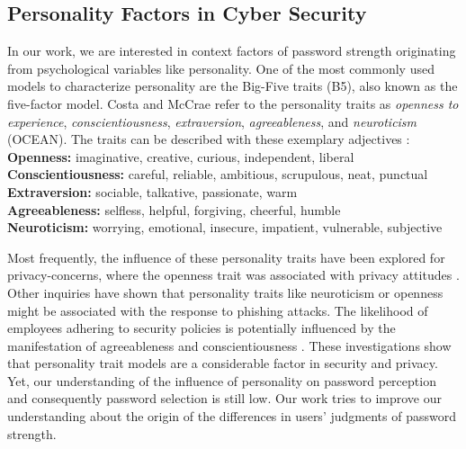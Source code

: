 \subsection{Personality Factors in Cyber Security}
In our work, we are interested in context factors of password strength originating from psychological variables like personality. One of the most commonly used models to characterize personality are the Big-Five traits (B5), also known as the five-factor model. Costa and McCrae \cite{Costa1992NEO} refer to the personality traits as \textit{openness to experience}, \textit{conscientiousness}, \textit{extraversion}, \textit{agreeableness}, and \textit{neuroticism} (OCEAN). The traits can be described with these exemplary adjectives \cite{McCrae1987ValidationFFM}:\\
\textbf{Openness:} imaginative, creative, curious, independent, liberal\\
\textbf{Conscientiousness:} careful, reliable, ambitious, scrupulous, neat, punctual\\
\textbf{Extraversion:} sociable, talkative, passionate, warm\\
\textbf{Agreeableness:} selfless, helpful, forgiving, cheerful, humble\\
\textbf{Neuroticism:} worrying, emotional, insecure, impatient, vulnerable, subjective

Most frequently, the influence of these personality traits have been explored for privacy-concerns, where the openness trait was associated with privacy attitudes \cite{Egelman2015PredictingAttitudes,Minkus2014PersonalizationPrivacy}. Other inquiries have shown that personality traits like neuroticism \cite{Halevi2013PilotStudyPersonality} or openness \cite{Uebelacker2014SocialEngineering} might be associated with the response to phishing attacks. The likelihood of employees adhering to security policies is potentially influenced by the manifestation of agreeableness and conscientiousness \cite{Shropshire2006PersonalityITSec,Shropshire2015}. These investigations show that personality trait models are a considerable factor in security and privacy. Yet, our understanding of the influence of personality on password perception and consequently password selection is still low. Our work tries to improve our understanding about the origin of the differences in users' judgments of password strength. 

